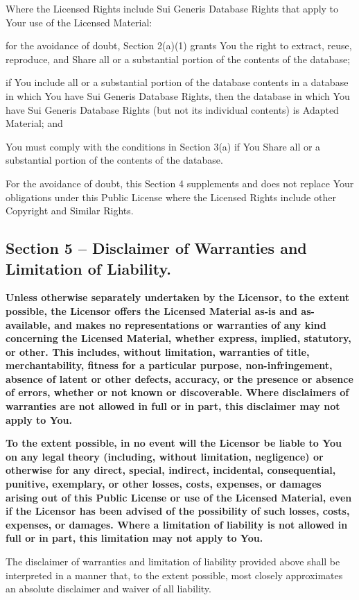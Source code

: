 \documentclass[12pt,a4paper]{article}
\begin{document}
Where the Licensed Rights include Sui Generis Database Rights that apply to Your use of the Licensed Material:
\begin{description}
\setlength{\itemsep}{0cm}
\item [a.]
    for the avoidance of doubt, Section 2(a)(1) grants You the right to extract, reuse, reproduce, and Share all or a substantial portion of the contents of the database;
\item[b.]
    if You include all or a substantial portion of the database contents in a database in which You have Sui Generis Database Rights, then the database in which You have Sui Generis Database Rights (but not its individual contents) is Adapted Material; and
\item[c.]
    You must comply with the conditions in Section 3(a) if You Share all or a substantial portion of the contents of the database.
  \end{description}
  For the avoidance of doubt, this Section 4 supplements and does not replace Your obligations under this Public License where the Licensed Rights include other Copyright and Similar Rights.

\subsection*{Section 5 – Disclaimer of Warranties and Limitation of Liability.}
\begin{description}
\setlength{\itemsep}{0cm}
\item[a.] \bf
    Unless otherwise separately undertaken by the Licensor, to the extent possible, the Licensor offers the Licensed Material as-is and as-available, and makes no representations or warranties of any kind concerning the Licensed Material, whether express, implied, statutory, or other. This includes, without limitation, warranties of title, merchantability, fitness for a particular purpose, non-infringement, absence of latent or other defects, accuracy, or the presence or absence of errors, whether or not known or discoverable. Where disclaimers of warranties are not allowed in full or in part, this disclaimer may not apply to You.
\item[b.] \bf    To the extent possible, in no event will the Licensor be liable to You on any legal theory (including, without limitation, negligence) or otherwise for any direct, special, indirect, incidental, consequential, punitive, exemplary, or other losses, costs, expenses, or damages arising out of this Public License or use of the Licensed Material, even if the Licensor has been advised of the possibility of such losses, costs, expenses, or damages. Where a limitation of liability is not allowed in full or in part, this limitation may not apply to You.
\item[c.]
    The disclaimer of warranties and limitation of liability provided above shall be interpreted in a manner that, to the extent possible, most closely approximates an absolute disclaimer and waiver of all liability.
\end{description}
\end{document}
